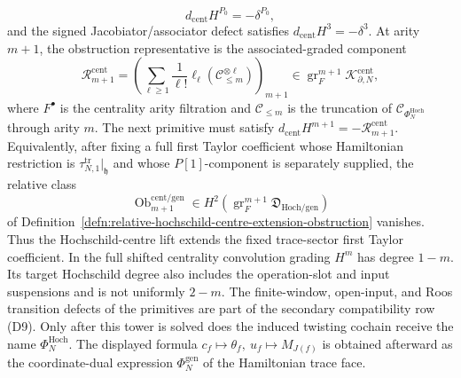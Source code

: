 \begin{defn}
\begin{enumerate}[label=\textup{(D\arabic*)}]
\[      d_{\mathrm{cent}}H^{P_0}=-\delta^{P_0},
    \]
    and the signed Jacobiator/associator defect satisfies
    \(d_{\mathrm{cent}}H^3=-\delta^3\).  At arity \(m+1\), the
    obstruction representative is the associated-graded component
    \[
      \mathcal R^{\mathrm{cent}}_{m+1}
      =
      \left(
      \sum_{\ell\ge1}\frac1{\ell!}
      \ell_\ell\!\left(
        \mathcal C_{\le m}^{\otimes \ell}\right)\right)_{m+1}
      \in
      \operatorname{gr}^{m+1}_{F}
      \mathcal K^{\mathrm{cent}}_{\partial,N},
    \]
    where \(F^\bullet\) is the centrality arity filtration and
    \(\mathcal C_{\le m}\) is the truncation of
    \(\mathcal C_{\Phi_N^{\mathrm{Hoch}}}\) through arity \(m\).  The
    next primitive must satisfy
    \(d_{\mathrm{cent}}H^{m+1}=-\mathcal R^{\mathrm{cent}}_{m+1}\).
    Equivalently, after fixing a full first Taylor coefficient whose
    Hamiltonian restriction is
    \(\tau_{N,1}^{\mathrm{tr}}|_{\mathfrak h}\) and whose
    \(P[1]\)-component is separately supplied, the relative class
    \[
      \operatorname{Ob}^{\mathrm{cent}/\mathrm{gen}}_{m+1}
      \in
      H^2\!\left(
      \operatorname{gr}^{m+1}_{F}
      \mathfrak D_{\mathrm{Hoch}/\mathrm{gen}}\right)
    \]
    of Definition~\ref{defn:relative-hochschild-centre-extension-obstruction}
    vanishes.  Thus the Hochschild-centre lift extends the fixed
    trace-sector first Taylor coefficient.
    In the full shifted centrality convolution grading \(H^m\) has
    degree \(1-m\).  Its target Hochschild degree also includes the
    operation-slot and input suspensions and is not uniformly \(2-m\).
    The
    finite-window, open-input, and Roos transition defects of the
    primitives are part of the secondary compatibility row
    \textup{(D9)}.  Only after this tower is solved does the induced
    twisting cochain receive the name \(\Phi_N^{\mathrm{Hoch}}\).  The
    displayed formula \(c_f\mapsto\theta_f,\ u_f\mapsto M_{J(f)}\) is
    obtained afterward as the coordinate-dual expression
    \(\Phi_N^{\mathrm{gen}}\) of the Hamiltonian trace face.


\end{enumerate}
\end{defn}
